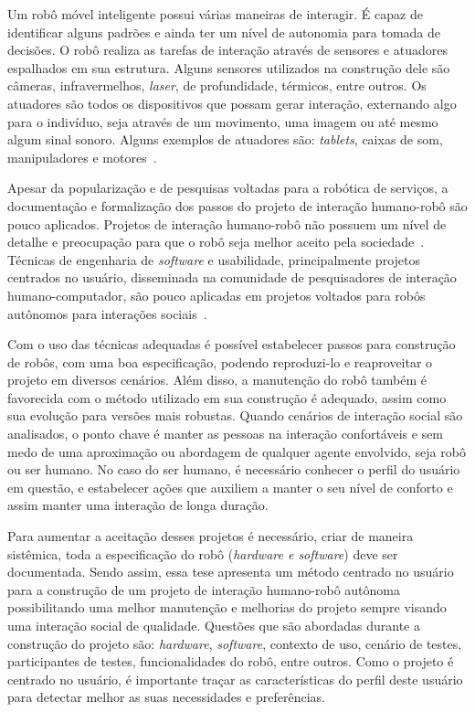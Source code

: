 Um robô móvel inteligente possui várias maneiras de interagir. É capaz de identificar alguns padrões e ainda ter um nível de autonomia para tomada de decisões. O robô realiza as tarefas de interação através de sensores e atuadores espalhados em sua estrutura. Alguns sensores utilizados na construção dele são câmeras, infravermelhos, \emph{laser}, de profundidade, térmicos, entre outros. Os atuadores são todos os dispositivos que possam gerar interação, externando algo para o indivíduo, seja através de um movimento, uma imagem ou até mesmo algum sinal sonoro. Alguns exemplos de atuadores são: \emph{tablets}, caixas de som, manipuladores e motores~\cite{looi:2012, choi:2014, dobra:2014}.

Apesar da popularização e de pesquisas voltadas para a robótica de serviços, a documentação e formalização dos passos do projeto de interação humano-robô são 
pouco aplicados. Projetos de interação humano-robô não possuem um nível de detalhe e preocupação para que o robô seja melhor aceito pela sociedade~\cite{alenljung:2017}. Técnicas de engenharia de \textit{software} e usabilidade, principalmente projetos centrados no usuário, disseminada na comunidade de pesquisadores de interação humano-computador, são pouco aplicadas em projetos voltados para robôs autônomos para interações sociais~\cite{alenljung:2017}.

Com o uso das técnicas adequadas é possível estabelecer passos para construção de robôs, com uma boa especificação, podendo reproduzi-lo e reaproveitar o projeto em diversos cenários. Além disso, a manutenção do robô também é favorecida com o método utilizado em sua construção é adequado, assim como sua evolução para versões mais robustas. Quando cenários de interação social são analisados, o ponto chave é manter as pessoas na interação confortáveis e sem medo de uma aproximação ou abordagem de qualquer agente envolvido, seja robô ou ser humano. No caso do ser humano, é necessário conhecer o perfil do usuário em questão, e estabelecer ações que auxiliem a manter o seu nível de conforto e assim manter uma interação de longa duração.

Para aumentar a aceitação desses projetos é necessário, criar de maneira sistêmica, toda a especificação do robô (\emph{hardware e software}) deve ser documentada. Sendo assim, essa tese apresenta um método centrado no usuário para a construção de um projeto de interação humano-robô autônoma possibilitando uma melhor manutenção e melhorias do projeto sempre visando uma interação social de qualidade. Questões que são abordadas durante a construção do projeto são: \emph{hardware}, \emph{software}, contexto de uso, cenário de testes, participantes de testes, funcionalidades do robô, entre outros. Como o projeto é centrado no usuário, é importante traçar as características do perfil deste usuário para detectar melhor as suas necessidades e preferências.

